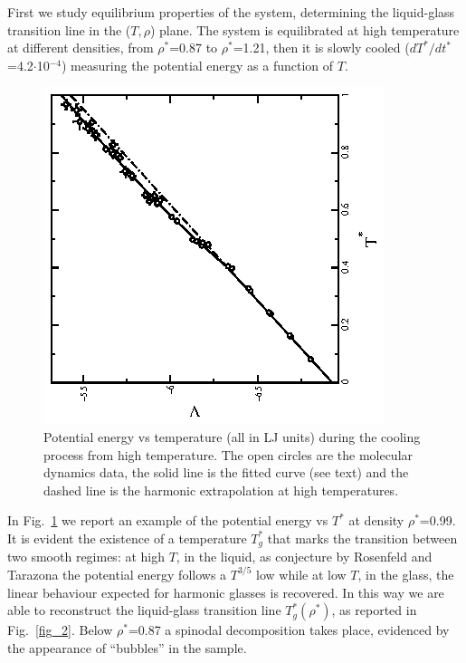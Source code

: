 First we study equilibrium properties of the system,
determining the liquid-glass transition line in the ($T,\rho$) plane.
The system is equilibrated at high temperature at different densities,
from $\rho^*$=0.87 to $\rho^*$=1.21, then it is slowly cooled
($dT^*/dt^*$=4.2$\cdot$10$^{-4}$) measuring the potential energy as a function of $T$.
\begin{figure}[t]
\centering
\includegraphics[width=.35\textwidth,angle=-90]{cool.eps}
\caption{
Potential energy vs temperature (all in LJ units) during the cooling
process from high temperature. The open circles are the molecular dynamics
data, the solid line is the fitted curve (see text) and the dashed line is
the harmonic extrapolation at high temperatures.}
\label{fig_1}
\end{figure}
In Fig.~\ref{fig_1} we report an example of the potential energy vs $T^*$
at density $\rho^*$=0.99.
It is evident the existence of a temperature $T^*_g$ that marks the transition
between two smooth regimes: at high $T$, in the liquid, as conjecture by Rosenfeld
and Tarazona \cite{ROTA} the potential energy follows a $T^{3/5}$ low while at low
$T$, in the glass, the linear behaviour expected for harmonic glasses is recovered.
In this way we are able to reconstruct the liquid-glass transition line
$T^*_g (\rho^*)$, as reported in Fig.~\ref{fig_2}. Below $\rho^*$=0.87 a
spinodal decomposition takes place, evidenced by the appearance of
``bubbles'' in the sample.

